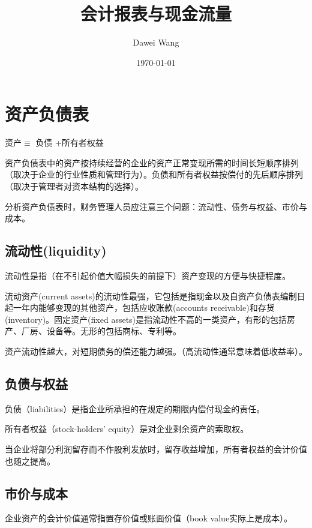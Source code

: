 \documentclass{article}
\title{会计报表与现金流量}
\author{Dawei Wang}
\date{\today}
\begin{document}
	\maketitle
\section{资产负债表}
 资产$\equiv$ 负债 +所有者权益 

\hspace*{\fill}

资产负债表中的资产按持续经营的企业的资产正常变现所需的时间长短顺序排列（取决于企业的行业性质和管理行为）。负债和所有者权益按偿付的先后顺序排列（取决于管理者对资本结构的选择）。

\hspace*{\fill}


分析资产负债表时，财务管理人员应注意三个问题：流动性、债务与权益、市价与成本。

\subsection{流动性(liquidity)}
流动性是指（在不引起价值大幅损失的前提下）资产变现的方便与快捷程度。

\hspace*{\fill}

流动资产(current assets)的流动性最强，它包括是指现金以及自资产负债表编制日起一年内能够变现的其他资产，包括应收账款(accounts receivable)和存货(inventory)。固定资产(fixed assets)是指流动性不高的一类资产，有形的包括房产、厂房、设备等。无形的包括商标、专利等。

\hspace*{\fill}

资产流动性越大，对短期债务的偿还能力越强。（高流动性通常意味着低收益率）。

\subsection{负债与权益}
负债（liabilities）是指企业所承担的在规定的期限内偿付现金的责任。

\hspace*{\fill}

所有者权益（stock-holders' equity）是对企业剩余资产的索取权。

\hspace*{\fill}

当企业将部分利润留存而不作股利发放时，留存收益增加，所有者权益的会计价值也随之提高。

\subsection{市价与成本}
企业资产的会计价值通常指置存价值或账面价值（book value实际上是成本）。
\end{document}
